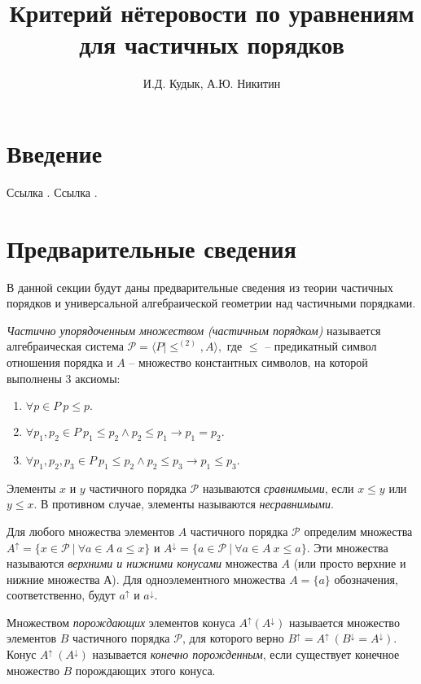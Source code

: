 \documentclass[12pt]{article}
\title{Критерий нётеровости по уравнениям для частичных порядков}
\author{И.Д. Кудык, А.Ю. Никитин}
\theoremstyle{break}
\def\P{\mathcal{P}}
\begin{document}
    \maketitle %
    \thispagestyle{empty} %
    \tableofcontents %
    \newpage
    
    \section{Введение}
    Ссылка \cite{Gretzer}. Ссылка \cite{AlgGeom}.

	\section{Предварительные сведения}
		В данной секции будут даны предварительные сведения из теории частичных порядков и универсальной алгебраической геометрии над частичными порядками.
			
		\textit{Частично упорядоченным множеством (частичным порядком)} называется алгебраическая система $\P = \langle P | \leqslant^{(2)}, A\rangle,$ где $\leqslant$ -- предикатный символ отношения порядка и $A$ -- множество константных символов, на которой выполнены 3 аксиомы:
		\begin{enumerate}
			\item $\forall p\in P\ p\leqslant p.$
			\item $\forall p_1, p_2\in P\ p_1 \leqslant p_2 \wedge p_2 \leqslant p_1 \rightarrow p_1=p_2.$
			\item $\forall p_1, p_2, p_3\in P\ p_1 \leqslant p_2 \wedge p_2 \leqslant p_3 \rightarrow p_1 \leqslant p_3.$
		\end{enumerate}
		
		Элементы $x$ и $y$ частичного порядка $\P$ называются \textit{сравнимыми}, если $x\leqslant y$ или $y\leqslant x.$ В противном случае, элементы называются \textit{несравнимыми}.
	
		Для любого множества элементов $A$ частичного порядка $\P$ определим множества $A^{\uparrow} = \{ x\in\P\ |\ \forall a\in A\ a\leqslant x\}$ и $A^{\downarrow} = \{ a\in\P\ |\ \forall a\in A\ x\leqslant a\}$. Эти множества называются \textit{верхними и нижними конусами} множества $A$ (или просто верхние и нижние множества А). Для одноэлементного множества $A=\{a\}$ обозначения, соответственно, будут $a^{\uparrow}$ и $a^{\downarrow}.$

		Множеством \textit{порождающих} элементов конуса $A^{\uparrow}(A^{\downarrow})$ называется множество элементов $B$ частичного порядка $\P$, для которого верно $B^{\uparrow}=A^{\uparrow}~(B^{\downarrow}=A^{\downarrow})$. Конус $A^{\uparrow}~(A^{\downarrow})$ называется \textit{конечно порожденным}, если существует конечное множество $B$ порождающих этого конуса.
\end{document}
